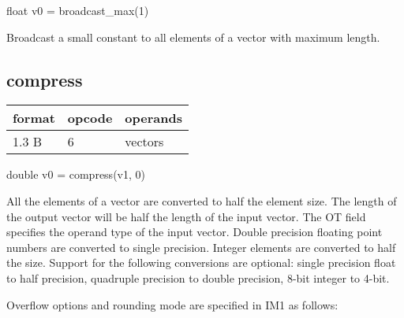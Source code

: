 \documentclass[forwardcom.tex]{subfiles}
\begin{document}
float v0 = broadcast\_max(1)
\vv

Broadcast a small constant to all elements of a vector with maximum length.
\vv


\subsection{compress}
\label{table:compressInstruction}
\begin{tabular}{|p{12mm}|p{15mm}|p{100mm}|}
\hline
\bfseries format & \bfseries opcode & \bfseries operands \\ \hline
1.3 B & 6 & vectors \\ \hline
\end{tabular}
\vv

double v0 = compress(v1, 0)
\vv

All the elements of a vector are converted to half the element size. The length of the output vector will be half the length of the input vector. The OT field specifies the operand type of the input vector. Double precision floating point numbers are converted to single precision. Integer elements are converted to half the size. Support for the following conversions are optional: single precision float to half precision, quadruple precision to double precision, 8-bit integer to 4-bit.
\vv

Overflow options and rounding mode are specified in IM1 as follows:
\end{document}
